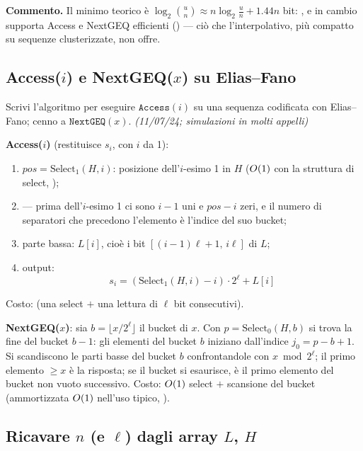 \textbf{Commento.} Il minimo teorico \`e $\log_2\binom{u}{n}\approx n\log_2\frac{u}{n}+1.44n$ bit:
, e in cambio
supporta Access e NextGEQ efficienti () --- ci\`o che l'interpolativo, pi\`u compatto su
sequenze clusterizzate, non offre. 

\subsection*{ Access($i$) e NextGEQ($x$) su Elias--Fano}

\begin{domanda}
Scrivi l'algoritmo per eseguire $\texttt{Access}(i)$ su una sequenza codificata con Elias--Fano;
cenno a $\texttt{NextGEQ}(x)$. \emph{(11/07/24; simulazioni in molti appelli)}
\end{domanda}

\textbf{Access($i$)} (restituisce $s_i$, con $i$ da 1):
\begin{enumerate}[leftmargin=1.8em,itemsep=1pt]
\item $\mathit{pos}=\mathrm{Select}_1(H,i)$: posizione dell'$i$-esimo 1 in $H$ ($O\!\left(1\right)$ con la
struttura di select, );
\item {} --- prima dell'$i$-esimo 1 ci sono $i-1$ uni e
$\mathit{pos}-i$ zeri, e il numero di separatori che precedono l'elemento \`e l'indice del suo
bucket;
\item parte bassa: $L[i]$, cio\`e i bit $[(i-1)\ell+1,\,i\ell]$ di $L$;
\item output:
\[
\boxed{\ s_i=(\mathrm{Select}_1(H,i)-i)\cdot 2^{\ell}+L[i]\ }
\]
\end{enumerate}
Costo:  (una select $+$ una lettura di $\ell$ bit consecutivi).

\textbf{NextGEQ($x$)}: sia $b=\lfloor x/2^{\ell}\rfloor$ il bucket di $x$. Con
$p=\mathrm{Select}_0(H,b)$ si trova la fine del bucket $b-1$: gli elementi del bucket $b$
iniziano dall'indice $j_0=p-b+1$. Si scandiscono le parti basse del bucket $b$ confrontandole con
$x\bmod 2^{\ell}$; il primo elemento $\ge x$ \`e la risposta; se il bucket si esaurisce, \`e il
primo elemento del bucket non vuoto successivo. Costo: $O\!\left(1\right)$ select $+$ scansione del bucket
(ammortizzata $O\!\left(1\right)$ nell'uso tipico, ).

\subsection*{ Ricavare $n$ (e $\ell$) dagli array $L$, $H$}

